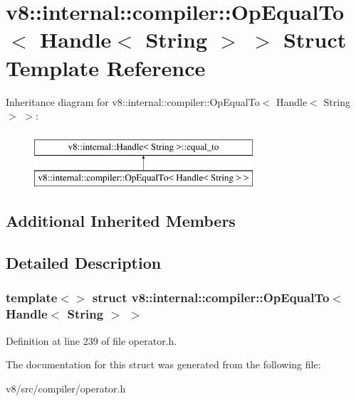 \hypertarget{structv8_1_1internal_1_1compiler_1_1OpEqualTo_3_01Handle_3_01String_01_4_01_4}{}\section{v8\+:\+:internal\+:\+:compiler\+:\+:Op\+Equal\+To$<$ Handle$<$ String $>$ $>$ Struct Template Reference}
\label{structv8_1_1internal_1_1compiler_1_1OpEqualTo_3_01Handle_3_01String_01_4_01_4}
Inheritance diagram for v8\+:\+:internal\+:\+:compiler\+:\+:Op\+Equal\+To$<$ Handle$<$ String $>$ $>$\+:\begin{figure}[H]
\begin{center}
\leavevmode
\includegraphics[height=2.000000cm]{structv8_1_1internal_1_1compiler_1_1OpEqualTo_3_01Handle_3_01String_01_4_01_4}
\end{center}
\end{figure}
\subsection*{Additional Inherited Members}


\subsection{Detailed Description}
\subsubsection*{template$<$$>$\newline
struct v8\+::internal\+::compiler\+::\+Op\+Equal\+To$<$ Handle$<$ String $>$ $>$}



Definition at line 239 of file operator.\+h.



The documentation for this struct was generated from the following file\+:\begin{DoxyCompactItemize}
\item 
v8/src/compiler/operator.\+h\end{DoxyCompactItemize}
